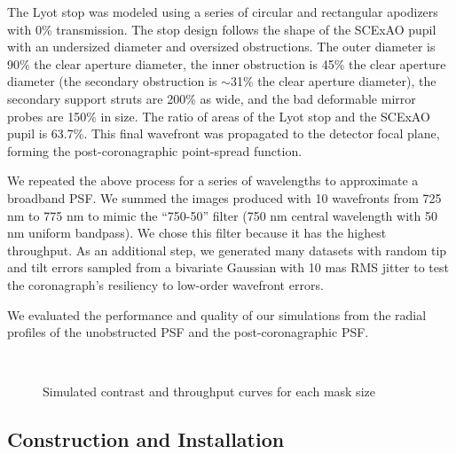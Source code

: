 \documentclass[]{spie}  %
\begin{document}
The Lyot stop was modeled using a series of circular and rectangular apodizers with 0\% transmission. The stop design follows the shape of the SCExAO pupil with an undersized diameter and oversized obstructions. The outer diameter is 90\% the clear aperture diameter, the inner obstruction is 45\% the clear aperture diameter (the secondary obstruction is $\sim$31\% the clear aperture diameter), the secondary support struts are 200\% as wide, and the bad deformable mirror probes are 150\% in size. The ratio of areas of the Lyot stop and the SCExAO pupil is 63.7\%. This final wavefront was propagated to the detector focal plane, forming the post-coronagraphic point-spread function.

We repeated the above process for a series of wavelengths to approximate a broadband PSF. We summed the images produced with 10 wavefronts from 725 nm to 775 nm to mimic the ``750-50'' filter (750 nm central wavelength with 50 nm uniform bandpass). We chose this filter because it has the highest throughput. As an additional step, we generated many datasets with random tip and tilt errors sampled from a bivariate Gaussian with 10 mas RMS jitter to test the coronagraph's resiliency to low-order wavefront errors.

We evaluated the performance and quality of our simulations from the radial profiles of the unobstructed PSF and the post-coronagraphic PSF.

\begin{figure*}[h!]
   \centering
   \\
   \caption{Simulated contrast and throughput curves for each mask size}\label{fig:sim-contrast}
\end{figure*}

\subsection{Construction and Installation}\label{sec:install}
\end{document}
